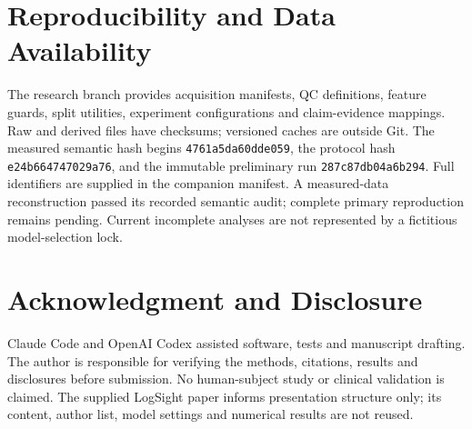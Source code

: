 \section{Reproducibility and Data Availability}
The research branch provides acquisition manifests, QC definitions, feature
guards, split utilities, experiment configurations and claim-evidence mappings.
Raw and derived files have checksums; versioned caches are outside Git.
The measured semantic hash begins \texttt{4761a5da60dde059}, the protocol hash
\texttt{e24b664747029a76}, and the immutable preliminary run
\texttt{287c87db04a6b294}. Full identifiers are supplied in the companion manifest.
A measured-data reconstruction passed its recorded semantic audit; complete
primary reproduction remains pending. Current incomplete analyses are not
represented by a fictitious model-selection lock.

\section*{Acknowledgment and Disclosure}
Claude Code and OpenAI Codex assisted software, tests and manuscript drafting.
The author is responsible for verifying the methods, citations, results and
disclosures before submission. No human-subject study or clinical validation
is claimed. The supplied LogSight paper informs presentation structure only;
its content, author list, model settings and numerical results are not reused.
